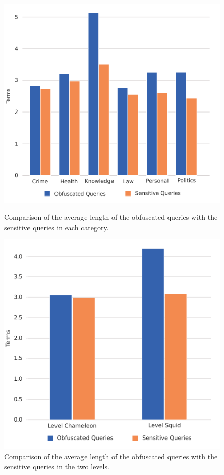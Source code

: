 \begin{figure}[h]
    \begin{minipage}[b][][b]{0.47\textwidth}
        \centering
        \includegraphics[width=1.0\textwidth]{graphics/evaluation/queries_length_comparison_original_categories.pdf}
                \caption{Comparison of the average length of the obfuscated queries with the sensitive queries in each category.}
    \label{fig:distribution:length:categories}
    \end{minipage}
    \hfill
    \begin{minipage}[b][][b]{0.47\textwidth}
        \centering
        \includegraphics[width=1.0\textwidth]{graphics/evaluation/queries_length_comparison_original.pdf}
                    \caption{Comparison of the average length of the obfuscated queries with the sensitive queries in the two levels.}
        \label{fig:distribution:length:level}
    \end{minipage}
\end{figure}

